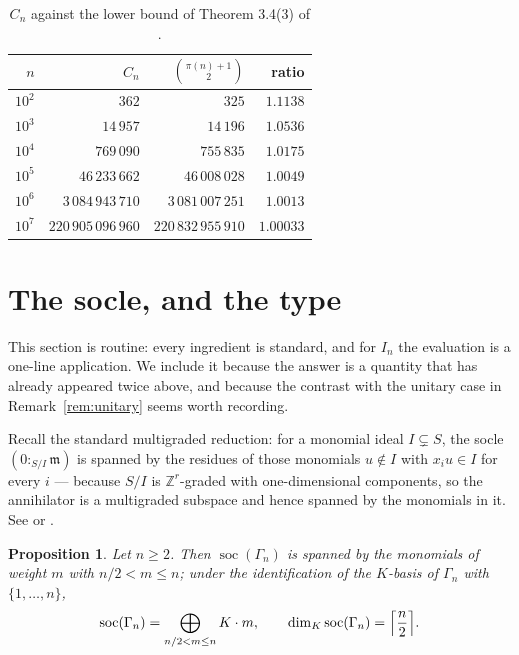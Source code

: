 \documentclass[a4paper,11pt,oneside,reqno]{amsart}
\theoremstyle{definition}
\theoremstyle{remark}
\theoremstyle{plain}
\newtheorem{proposition}[definition]{Proposition}
\newcommand{\ZZ}{\mathbb{Z}}
\newcommand{\Gam}{\Gamma}
\begin{document}
\begin{table}[ht]
  \centering
  \begin{tabular}{rrrr}
    \toprule
    \(n\) & \(C_n\) & \(\binom{\pi(n)+1}{2}\) & ratio \\
    \midrule
    \(10^{2}\) & \(362\) & \(325\) & \(1.1138\) \\
    \(10^{3}\) & \(14\,957\) & \(14\,196\) & \(1.0536\) \\
    \(10^{4}\) & \(769\,090\) & \(755\,835\) & \(1.0175\) \\
    \(10^{5}\) & \(46\,233\,662\) & \(46\,008\,028\) & \(1.0049\) \\
    \(10^{6}\) & \(3\,084\,943\,710\) & \(3\,081\,007\,251\) & \(1.0013\) \\
    \(10^{7}\) & \(220\,905\,096\,960\) & \(220\,832\,955\,910\) & \(1.00033\) \\
    \bottomrule
  \end{tabular}
  \caption{\(C_n\) against the lower bound of Theorem 3.4(3) of
    \cite{Snellman2000}.}\label{tab:err}
\end{table}

\section{The socle, and the type}\label{sec:socle}

This section is routine: every ingredient is standard, and for \(I_n\) the
evaluation is a one-line application. We include it because the answer is a
quantity that has already appeared twice above, and because the contrast with
the unitary case in Remark~\ref{rem:unitary} seems worth recording.

Recall the standard multigraded reduction: for a monomial ideal \(I \subsetneq S\),
the socle \((0:_{S/I}\mathfrak m)\) is spanned by the residues of those
monomials \(u \notin I\) with \(x_iu \in I\) for every \(i\) --- because \(S/I\)
is \(\ZZ^{r}\)-graded with one-dimensional components, so the annihilator is a
multigraded subspace and hence spanned by the monomials in it. See
\cite{HerzogHibi} or \cite{MillerSturmfels}.

\begin{proposition}\label{prop:socle}
  Let \(n \ge 2\). Then \(\operatorname{soc}(\Gam_n)\) is spanned by the
  monomials of weight \(m\) with \(n/2 < m \le n\); under the identification of
  the \(K\)-basis of \(\Gam_n\) with \(\{1,\dots,n\}\),
  \[
    \operatorname{soc}(\Gam_n) = \bigoplus_{n/2 < m \le n}K \cdot m,
    \qquad
    \dim_K\operatorname{soc}(\Gam_n) = \Bigl\lceil\frac{n}{2}\Bigr\rceil .
  \]
\end{proposition}
\end{document}

